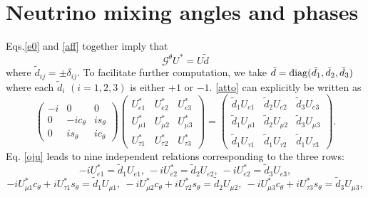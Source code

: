 \documentclass[11pt]{article}
\begin{document}
\section{Neutrino mixing angles and phases}\label{sec3} Eqs.\eqref{e0} and \eqref{aff} together imply\cite{Grimus:2003yn} that \begin{equation}\mathcal{G}^\theta U^*=U\tilde{d}\label{atto}\end{equation} where $\tilde{d}_{ij}=\pm \delta_{ij}.$ To facilitate further computation, we take $\tilde{d}={\rm diag}(\tilde{d}_1,\tilde{d}_2,\tilde{d}_3)$ where each $\tilde{d}_i$ $(i = 1, 2, 3)$ is either $+1$ or $-1$. \eqref{atto} can explicitly be written as
\begin{equation}\begin{pmatrix}-i & 0 & 0\\0 & -ic_\theta & is_\theta\\0 & is_\theta & ic_\theta \end{pmatrix}\begin{pmatrix}
U^*_{e1} & U^*_{e2} & U^*_{e 3}\\U^*_{\mu 1} & U^*_{\mu2} & U^*_{\mu3}\\
U^*_{\tau1} & U^*_{\tau2} & U^*_{\tau3}
\end{pmatrix}=\begin{pmatrix}
\tilde{d}_1 U_{e1} & \tilde{d}_2 U_{e2} & \tilde{d}_3 U_{e 3}\\
\tilde{d}_1 U_{\mu 1} & \tilde{d}_2 U_{\mu2} & \tilde{d}_3 U_{\mu3}\\
\tilde{d}_1 U_{\tau1} & \tilde{d}_1 U_{\tau2} & \tilde{d}_1 U_{\tau3}
\end{pmatrix}.\label{oju}
\end{equation} Eq. \eqref{oju} leads to nine independent relations corresponding to the three rows: $$
-iU^*_{e1}=\tilde{d}_1U_{e1},~-iU^*_{e2}=\tilde{d}_2U_{e2},~-iU^*_{e2}=\tilde{d}_3U_{e3},$$ $$-iU^*_{\mu 1}c_\theta+iU^*_{\tau 1}s_\theta=\tilde{d}_1U_{\mu 1},~-iU^*_{\mu 2}c_\theta+iU^*_{\tau 2}s_\theta=\tilde{d}_2U_{\mu 2},~ -iU^*_{\mu 3}c_\theta+iU^*_{\tau 3}s_\theta=\tilde{d}_3U_{\mu 3},$$
\end{document}
